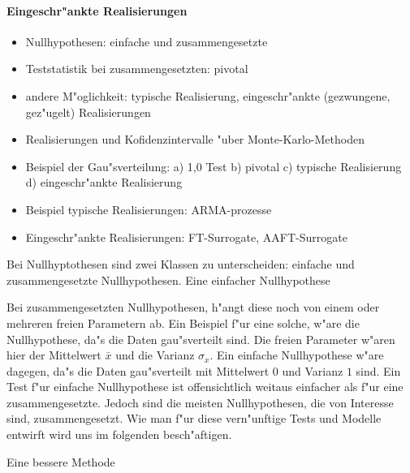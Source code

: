 \paragraph{Eingeschr"ankte Realisierungen}



\begin{itemize}
\item Nullhypothesen: einfache und zusammengesetzte
\item Teststatistik bei zusammengesetzten: pivotal
\item andere M"oglichkeit: typische Realisierung, eingeschr"ankte (gezwungene, gez"ugelt) Realisierungen 
\item Realisierungen und Kofidenzintervalle "uber Monte-Karlo-Methoden
\item Beispiel der Gau"sverteilung: a) 1,0 Test b) pivotal c) typische Realisierung d) eingeschr"ankte Realisierung
\item Beispiel typische Realisierungen: ARMA-prozesse
\item Eingeschr"ankte Realisierungen: FT-Surrogate, AAFT-Surrogate
\end{itemize}


Bei Nullhyptothesen sind zwei Klassen zu unterscheiden: einfache und zusammengesetzte
Nullhypothesen.  Eine einfacher Nullhypothese

Bei zusammengesetzten Nullhypothesen, h"angt diese noch von einem oder mehreren freien
Parametern ab. Ein Beispiel f"ur eine solche, w"are die Nullhypothese, da"s die Daten
gau"sverteilt sind. Die freien Parameter w"aren hier der Mittelwert $\bar x$ und die
Varianz $\sigma_x$. Ein einfache Nullhypothese w"are dagegen, da"s die Daten gau"sverteilt
mit Mittelwert $0$ und Varianz $1$ sind. Ein Test f"ur einfache Nullhypothese ist
offensichtlich weitaus einfacher als f"ur eine zusammengesetzte. Jedoch sind die meisten
Nullhypothesen, die von Interesse sind, zusammengesetzt. Wie man f"ur diese vern"unftige
Tests und Modelle entwirft wird uns im folgenden besch"aftigen.






Eine bessere Methode \cite{prichard-theiler3}


